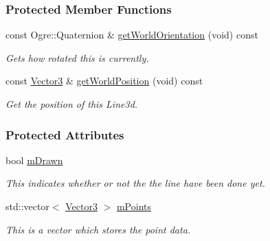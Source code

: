 \subsubsection*{Protected Member Functions}
\begin{DoxyCompactItemize}
\item 
const Ogre::Quaternion \& \hyperlink{classMezzanine_1_1internal_1_1Line3D_a90e46fc395926d4c7921f432ccaba833}{getWorldOrientation} (void) const 
\begin{DoxyCompactList}\small\item\em Gets how rotated this is currently. \item\end{DoxyCompactList}\item 
const \hyperlink{classMezzanine_1_1Vector3}{Vector3} \& \hyperlink{classMezzanine_1_1internal_1_1Line3D_a7cdec9a0d2cb752a0befaa2fd02a3d1e}{getWorldPosition} (void) const 
\begin{DoxyCompactList}\small\item\em Get the position of this Line3d. \item\end{DoxyCompactList}\end{DoxyCompactItemize}
\subsubsection*{Protected Attributes}
\begin{DoxyCompactItemize}
\item 
\hypertarget{classMezzanine_1_1internal_1_1Line3D_a08d6690ee5a910bf2bff8877535c3f25}{
bool \hyperlink{classMezzanine_1_1internal_1_1Line3D_a08d6690ee5a910bf2bff8877535c3f25}{mDrawn}}
\label{classMezzanine_1_1internal_1_1Line3D_a08d6690ee5a910bf2bff8877535c3f25}

\begin{DoxyCompactList}\small\item\em This indicates whether or not the the line have been done yet. \item\end{DoxyCompactList}\item 
\hypertarget{classMezzanine_1_1internal_1_1Line3D_a80778773c7550edf48fd9f9922302a34}{
std::vector$<$ \hyperlink{classMezzanine_1_1Vector3}{Vector3} $>$ \hyperlink{classMezzanine_1_1internal_1_1Line3D_a80778773c7550edf48fd9f9922302a34}{mPoints}}
\label{classMezzanine_1_1internal_1_1Line3D_a80778773c7550edf48fd9f9922302a34}

\begin{DoxyCompactList}\small\item\em This is a vector which stores the point data. \item\end{DoxyCompactList}\end{DoxyCompactItemize}


